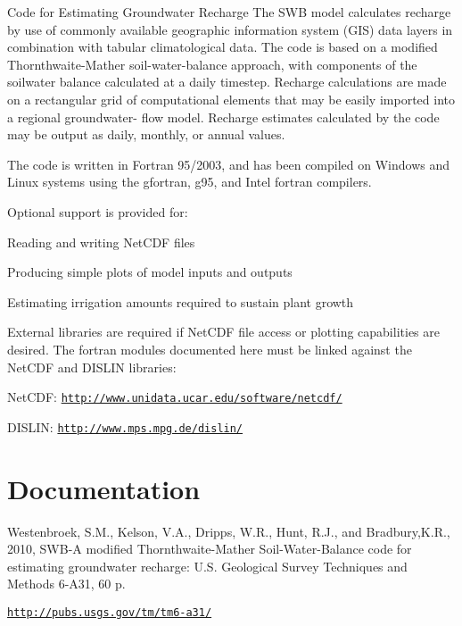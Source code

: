 Code for Estimating Groundwater Recharge The SWB model calculates recharge by use of commonly available geographic information system (GIS) data layers in combination with tabular climatological data. The code is based on a modified Thornthwaite-\/Mather soil-\/water-\/balance approach, with components of the soilwater balance calculated at a daily timestep. Recharge calculations are made on a rectangular grid of computational elements that may be easily imported into a regional groundwater-\/ flow model. Recharge estimates calculated by the code may be output as daily, monthly, or annual values. \begin{DoxyParagraph}{}
The code is written in Fortran 95/2003, and has been compiled on Windows and Linux systems using the gfortran, g95, and Intel fortran compilers. 
\end{DoxyParagraph}
\begin{DoxyParagraph}{}
Optional support is provided for:
\begin{DoxyItemize}
\item Reading and writing NetCDF files
\item Producing simple plots of model inputs and outputs
\item Estimating irrigation amounts required to sustain plant growth 
\end{DoxyItemize}
\end{DoxyParagraph}
\begin{DoxyParagraph}{}
External libraries are required if NetCDF file access or plotting capabilities are desired. The fortran modules documented here must be linked against the NetCDF and DISLIN libraries:
\begin{DoxyItemize}
\item NetCDF: \href{http://www.unidata.ucar.edu/software/netcdf/}{\tt http://www.unidata.ucar.edu/software/netcdf/}
\item DISLIN: \href{http://www.mps.mpg.de/dislin/}{\tt http://www.mps.mpg.de/dislin/} 
\end{DoxyItemize}
\end{DoxyParagraph}
\hypertarget{index_Documentation}{}\section{Documentation}\label{index_Documentation}
Westenbroek, S.M., Kelson, V.A., Dripps, W.R., Hunt, R.J., and Bradbury,K.R., 2010, SWB-\/A modified Thornthwaite-\/Mather Soil-\/Water-\/Balance code for estimating groundwater recharge: U.S. Geological Survey Techniques and Methods 6-\/A31, 60 p. \begin{DoxyParagraph}{}
\href{http://pubs.usgs.gov/tm/tm6-a31/}{\tt http://pubs.usgs.gov/tm/tm6-\/a31/} 
\end{DoxyParagraph}
